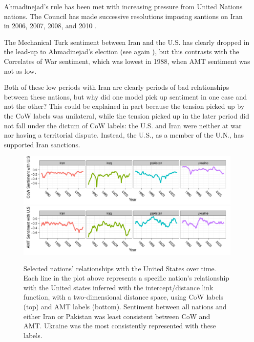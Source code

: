 \begin{itemize}
    Ahmadinejad's rule has been met with increasing pressure from
    United Nations nations.  The Council has made successive
    resolutions imposing santions on Iran in 2006, 2007, 2008, and
    2010 \citep{iranstate:2012}.

    The Mechanical Turk sentiment between Iran and the U.S. has
    clearly dropped in the lead-up to Ahmadinejad's election (see
    again ), but this contrasts
    with the Correlates of War sentiment, which was lowest in 1988,
    when AMT sentiment was not as low.

\end{itemize}
 
Both of these low periods with Iran are clearly periods of bad
relationships between these nations, but why did one model pick up
sentiment in one case and not the other?  This could be explained in
part because the tension picked up by the CoW labels was unilateral,
while the tension picked up in the later period did not fall under the
dictum of CoW labels: the U.S. and Iran were neither at war nor having
a territorial dispute.  Instead, the U.S., as a member of the U.N., has
supported Iran sanctions.


\begin{figure}
  \center
    \includegraphics[width=1\textwidth]{chapter_foreign_relations/figures/012_fr_cow_mutual_sentiment_with_us.pdf}
    \includegraphics[width=1\textwidth]{chapter_foreign_relations/figures/012_fr_mturk_mutual_sentiment_with_us.pdf}
  \label{fig:nation_positions_over_time}
  \caption{Selected nations' relationships with the United States
    over time.  Each line in the plot above represents a specific
    nation's relationship with the United states inferred with the
    intercept/distance link function, with a two-dimensional distance
    space, using CoW labels (top) and AMT labels (bottom).  Sentiment
    between all nations and either Iran or Pakistan was
    least consistent between CoW and AMT. Ukraine was
    the most consistently represented with these labels.}
\end{figure}

